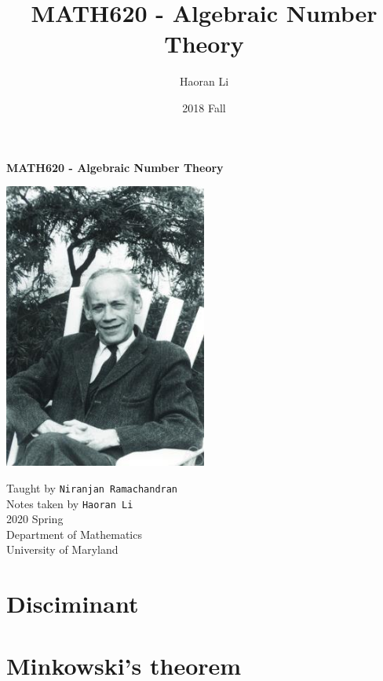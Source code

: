 \documentclass[a4paper,10pt]{article}
\title{MATH620 - Algebraic Number Theory}
\author{Haoran Li}
\date{2018 Fall}
\begin{document}
\sloppy %

\begin{titlepage}
\begin{center}
\vspace*{1cm}
\LARGE
\textbf{MATH620 - Algebraic Number Theory} \\
\vspace{2cm}
\begin{center}
\includegraphics[width=0.5\textwidth]{Pictures/Emil_Artin.jpg}
\end{center}
\vspace{2cm}
\normalsize
Taught by \texttt{Niranjan Ramachandran} \\
Notes taken by \texttt{Haoran Li} \\
2020 Spring \\
\vspace{2cm}
Department of Mathematics\\
University of Maryland\\
\end{center}
\end{titlepage}

\tableofcontents
\newpage

\section{Disciminant}

\newpage

\section{Minkowski's theorem}

\newpage
\end{document}
